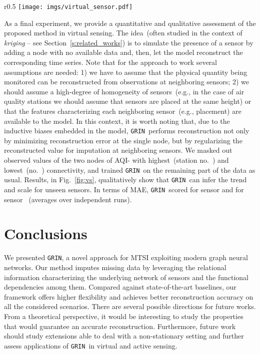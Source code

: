 \documentclass{article} \usepackage{iclr2022_conference,times}
\newcommand{\GRIL}{\texttt{GRIN}}
\begin{document}
\begin{wrapfigure}{r}{0.5\linewidth}
  \centering
\vspace{-0.75cm}
\texttt{[image: imgs/virtual\_sensor.pdf]}
\vspace{-1.cm}
\caption{Reconstruction of observations from sensors removed from the training set. Plots show that \GRIL\ might be used for virtual sensing.}
\label{fig:vs}
\end{wrapfigure}

As a final experiment, we provide a quantitative and qualitative assessment of the proposed method in virtual sensing. The idea~(often studied in the context of \textit{kriging} -- see Section~\ref{s:related_works}) is to simulate the presence of a sensor by adding a node with no available data and, then, let the model reconstruct the corresponding time series. Note that for the approach to work several assumptions are needed: 1) we have to assume that the physical quantity being monitored can be reconstructed from observations at neighboring sensors; 2) we should assume a high-degree of homogeneity of sensors~(e.g., in the case of air quality stations we should assume that sensors are placed at the same height) or that the features characterizing each neighboring sensor~(e.g., placement) are available to the model. In this context, it is worth noting that, due to the inductive biases embedded in the model, \GRIL\ performs reconstruction not only by minimizing reconstruction error at the single node, but by regularizing the reconstructed value for imputation at neighboring sensors. We masked out observed values of the two nodes of AQI- with highest~(station no.\ ) and lowest~(no.\ ) connectivity, and trained \GRIL\ on the remaining part of the data as usual. Results, in Fig.~\ref{fig:vs}, qualitatively show that \GRIL\ can infer the trend and scale for unseen sensors. In terms of MAE, \GRIL\ scored  for sensor  and  for sensor ~(averages over  independent runs).

\section{Conclusions}\label{s:conclusion}

We presented \GRIL, a novel approach for MTSI exploiting modern graph neural networks. Our method imputes missing data by leveraging the relational information characterizing the underlying network of sensors and the functional dependencies among them. Compared against state-of-the-art baselines, our framework offers higher flexibility and achieves better reconstruction accuracy on all the considered scenarios. 
There are several possible directions for future works. From a theoretical perspective, it would be interesting to study the properties that would guarantee an accurate reconstruction. Furthermore, future work should study extensions able to deal with a non-stationary setting and further assess applications of \GRIL\ in virtual and active sensing. 
\end{document}
